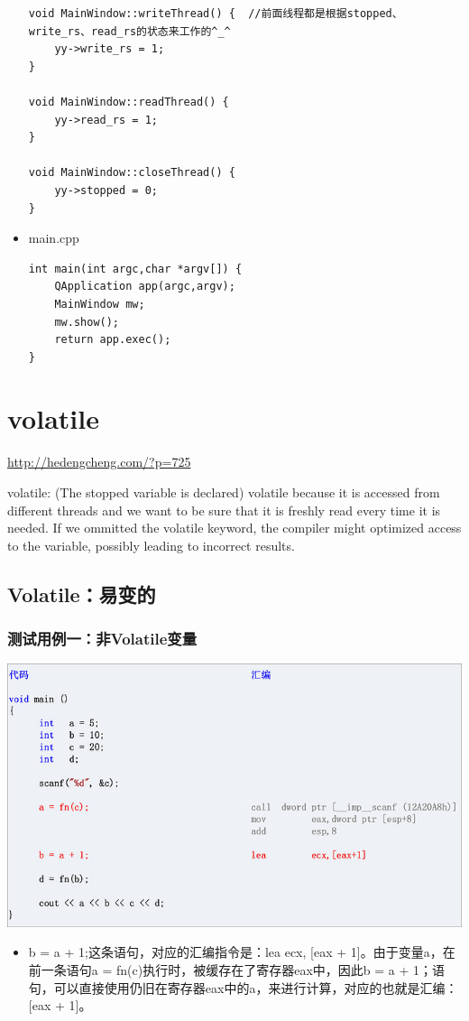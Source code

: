 \documentclass[9pt,b5paper]{article}
\begin{document}
\begin{itemize}
\begin{lstlisting}
void MainWindow::writeThread() {  //前面线程都是根据stopped、write_rs、read_rs的状态来工作的^_^      
    yy->write_rs = 1;     
}    

void MainWindow::readThread() {     
    yy->read_rs = 1;     
}     

void MainWindow::closeThread() {     
    yy->stopped = 0;     
}
\end{lstlisting}
\item main.cpp

\lstset{language=java,label= ,caption= ,numbers=none}
\begin{lstlisting}
int main(int argc,char *argv[]) {     
    QApplication app(argc,argv);     
    MainWindow mw;     
    mw.show();     
    return app.exec();     
}
\end{lstlisting}
\end{itemize}

\section{volatile}
\label{sec-8}
\url{http://hedengcheng.com/?p=725}

volatile: (The stopped variable is declared) volatile because it is accessed from different threads and we want to be sure that it is freshly read every time it is needed. If we ommitted the volatile keyword, the compiler might optimized access to the variable, possibly leading to incorrect results. 
\subsection{Volatile：易变的}
\label{sec-8-1}
\subsubsection{测试用例一：非Volatile变量}
\label{sec-8-1-1}
\includegraphics[width=.9\linewidth]{../pic/v1.jpg}
\begin{itemize}
\item b = a + 1;这条语句，对应的汇编指令是：lea ecx, [eax + 1]。由于变量a，在前一条语句a = fn(c)执行时，被缓存在了寄存器eax中，因此b = a + 1；语句，可以直接使用仍旧在寄存器eax中的a，来进行计算，对应的也就是汇编：[eax + 1]。
\end{itemize}
\end{document}
